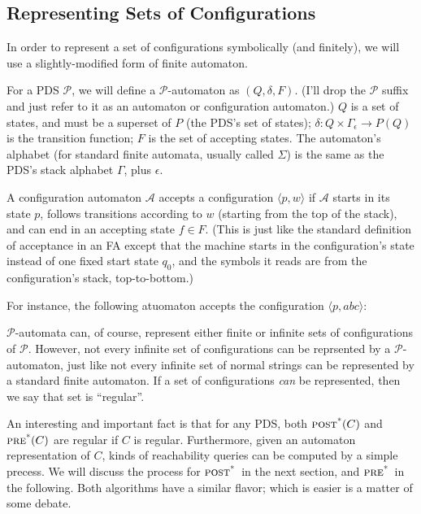\documentclass{article}
\newcommand{\Config}[2]{\ensuremath{\langle #1, #2 \rangle}}
\newcommand{\powerset}[1]{P(#1)}
\newcommand{\poststar}{\ensuremath{\textsc{post}^\textsc{*}}}
\newcommand{\prestar}{\ensuremath{\textsc{pre}^\textsc{*}}}
\begin{document}
\subsection{Representing Sets of Configurations}

In order to represent a set of configurations symbolically (and
finitely), we will use a slightly-modified form of finite
automaton.

For a PDS $\mathcal{P}$, we will define a $\mathcal{P}$-automaton as
$(Q, \delta, F)$. (I'll drop the $\mathcal{P}$ suffix and just refer
to it as an automaton or configuration automaton.) $Q$ is a set of
states, and must be a superset of $P$ (the PDS's set of states);
$\delta: Q \times \Gamma_\epsilon \rightarrow \powerset{Q}$ is the
transition function; $F$ is the set of accepting states. The
automaton's alphabet (for standard finite automata, usually called
$\Sigma$) is the same as the PDS's stack alphabet $\Gamma$, plus
$\epsilon$.

A configuration automaton $\mathcal{A}$ accepts a configuration
\Config{p}{w} if $\mathcal{A}$ starts in its state $p$, follows
transitions according to $w$ (starting from the top of the stack), and
can end in an accepting state $f \in F$. (This is just like the
standard definition of acceptance in an FA except that the machine
starts in the configuration's state instead of one fixed start state
$q_0$, and the symbols it reads are from the configuration's stack,
top-to-bottom.)

For instance, the following atuomaton accepts the configuration
\Config{p}{abc}:



$\mathcal{P}$-automata can, of course, represent either finite or
infinite sets of configurations of $\mathcal{P}$. However, not every
infinite set of configurations can be reprsented by a
$\mathcal{P}$-automaton, just like not every infinite set of normal
strings can be represented by a standard finite automaton. If a set of
configurations \emph{can} be represented, then we say that set is
``regular''.

An interesting and important fact is that for any PDS, both
$\poststar(C)$ and $\prestar(C)$ are regular if $C$ is
regular. Furthermore, given an automaton representation of $C$, kinds
of reachability queries can be computed by a simple precess. We will
discuss the process for \poststar\ in the next section, and
\prestar\ in the following. Both algorithms have a similar flavor;
which is easier is a matter of some debate.
\end{document}
